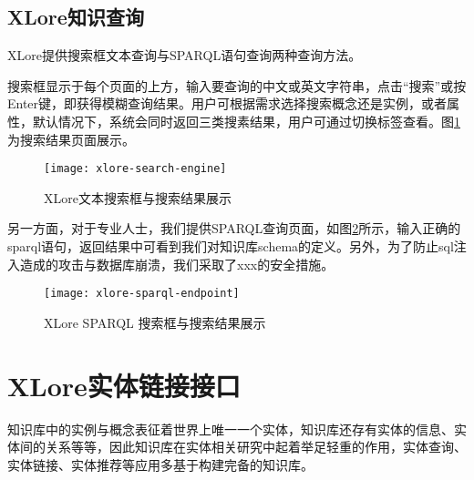 
\subsection{XLore知识查询}
XLore提供搜索框文本查询与SPARQL语句查询两种查询方法。

搜索框显示于每个页面的上方，输入要查询的中文或英文字符串，点击“搜索”或按Enter键，即获得模糊查询结果。用户可根据需求选择搜索概念还是实例，或者属性，默认情况下，系统会同时返回三类搜素结果，用户可通过切换标签查看。图\ref{fig:xlore-search-engine}为搜索结果页面展示。

\begin{figure}[H] 
  \centering
  \texttt{[image: xlore-search-engine]}
  \caption{XLore文本搜索框与搜索结果展示}
  \label{fig:xlore-search-engine}
\end{figure}

另一方面，对于专业人士，我们提供SPARQL查询页面，如图\ref{fig:xlore-sparql-endpoint}所示，输入正确的sparql语句，返回结果中可看到我们对知识库schema的定义。另外，为了防止sql注入造成的攻击与数据库崩溃，我们采取了xxx的安全措施。

\begin{figure}[H] 
  \centering
  \texttt{[image: xlore-sparql-endpoint]}
  \caption{XLore SPARQL 搜索框与搜索结果展示}
  \label{fig:xlore-sparql-endpoint}
\end{figure}

\section{XLore实体链接接口}
\label{sec5:entity-linking-api}

知识库中的实例与概念表征着世界上唯一一个实体，知识库还存有实体的信息、实体间的关系等等，因此知识库在实体相关研究中起着举足轻重的作用，实体查询、实体链接、实体推荐等应用多基于构建完备的知识库。

